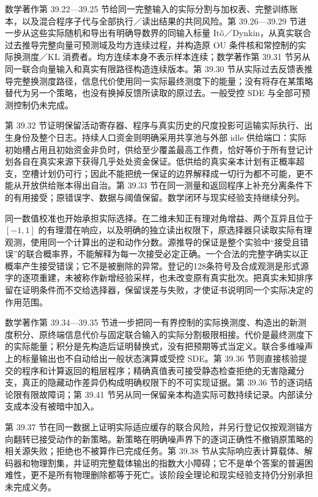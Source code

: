 \documentclass[
  11pt,
  oneside]{book}
\begin{document}
数学著作第 39.22---39.25 节给同一完整输入的实际分割与加权表、完整训练账本，以及混合程序子代与全部执行／读出结果的共同风险。第 39.26---39.29 节进一步从这些实际随机和导出有明确导数界的同输入标量 Itô／Dynkin，从真实联合过去推导完整向量可预测域及均方连续过程，并构造原 OU 条件核和常控制的实际换测度／KL 消费者。均方连续本身不表示样本连续；数学著作第 39.31 节另从同一联合向量输入和真实有限路径构造连续版本。第 39.30 节从实际过去反馈表推导完整换测度路径，信息代价使用同一实际最终测度下的能量；没有将存在某策略替代为另一个策略，也没有换掉反馈所读取的原过去。一般受控 SDE 与全部可预测控制仍未完成。

第 39.32 节证明保留活动寄存器、程序与真实历史的尺度投影可运输实际执行、出生身份及整个日志。持续人口资金则明确采用共享池与外部 idle 供给端口：实际初始槽占用且初始资金非负时，供给至少覆盖最高工作费，恰好等价于所有登记计划各自在真实来源下获得几乎处处资金保证。低供给的真实亲本计划有正概率超支，空槽计划仍可行；因此不能把统一保证的边界解释成一切行为都不可能，更不能从开放供给账本得出自治。第 39.33 节在同一测量和返回程序上补充分离条件下的有用接受；原错误字、数据与阈值保留。数学闭环与现实经验支持继续分列。

同一数值校准也开始承担实际选择。在二维未知正有理对角增益、两个互异且位于 \([-1,1]\) 的有理潜在响应，以及明确的独立读出权限下，原选择器只读取实际有理观测，使用同一个计算出的逆和动作分数。源推导的保证是整个实验中``接受且错误''的联合概率界，不能解释为每一次接受必定正确。一个合法的完整字确实以正概率产生接受错误；它不是被删除的异常。登记的128条符号及合成观测是形式源字的逐项重建，未被称作新增经验采样，也未改变原有真实批次。把真实未知排序留在证明条件而不交给选择器，保留误差与失败，才使证书说明同一个实际决定的作用范围。

数学著作第 39.34---39.35 节进一步把同一有界控制的实际换测度、构造出的新测度积分、原终端信息代价与固定联合输入的实际分割极限相接。代价是最终测度下的实际能量；积分是先构造后证明替换式，没有把预期等式当定义。联合多维噪声上的标量输出也不自动给出一般状态演算或受控 SDE。第 39.36 节则直接核验提交的程序和计算返回的粗层程序；精确真值表可接受静态检查拒绝的无害隐藏分支，真正的隐藏动作差异仍构成明确权限下的不可实现证据。第 39.36 节的逐词结论限有限故障词；第 39.41 节另从同一保留亲本构造实际可数持续记录。内部读分支成本没有被暗中加入。

第 39.37 节在同一数据上证明实际适应缓存的联合风险，并另行登记仅按观测锚方向翻转已接受动作的新策略。新策略在明确噪声界下的逐词正确性不撤销原策略的相关源失败；拒绝也不被算作已完成任务。第 39.38 节从实际响应表计算载体、解码器和物理割集，并证明完整载体输出的指数大小障碍；它不是单个答案的普遍困难性，更不是所有物理删除都等于死亡。该阶段全理论和现实经验支持仍分别承担未完成义务。
\end{document}
